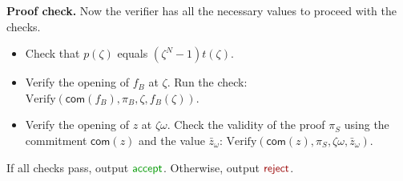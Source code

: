 \documentclass[../lecture-notes-148x210.tex]{subfiles}
\begin{document}
\textcolor{blue!60!black}{\textbf{Proof check.}} Now the verifier has all the
necessary values to proceed with the checks.
\begin{itemize}
    \item Check that $p(\zeta)$ equals $(\zeta^N - 1)t(\zeta)$.
    \item Verify the opening of $f_{B}$ at $\zeta$. 
    Run the check: $
            \text{Verify}(\mathsf{com}(f_{B}), \pi_{B}, \zeta, f_{B}(\zeta))
            $.
    \item Verify the opening of $z$ at $\zeta\omega$. 
    Check the
    validity of the proof $\pi_{S}$ using the commitment $\mathsf{com}(z)$ and the
    value $\bar{z}_{\omega}$: $
            \text{Verify}(\mathsf{com}(z), \pi_{S}, \zeta\omega, \bar{z}_{\omega})
            $.
\end{itemize}

If all checks pass, output $\textcolor{green!60!black}{\mathsf{accept}}$.
Otherwise, output $\textcolor{red!60!black}{\mathsf{reject}}$.
\end{document}
